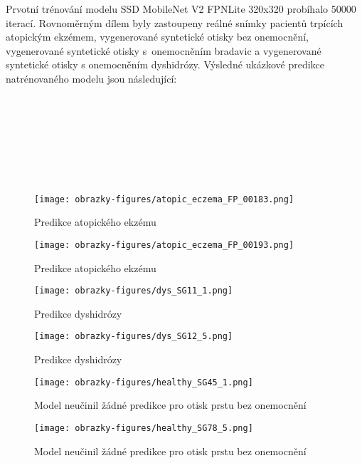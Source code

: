 Prvotní trénování modelu SSD MobileNet V2 FPNLite 320x320 probíhalo 50000 iterací. Rovnoměrným dílem byly zastoupeny reálné snímky pacientů trpících atopickým ekzémem, vygenerované syntetické otisky bez onemocnění, vygenerované syntetické otisky s~onemocněním bradavic a vygenerované syntetické otisky s onemocněním dyshidrózy. Výsledné ukázkové predikce natrénovaného modelu jsou následující:\\\\\\\\\\\\\\\

\begin{figure}[!htbp]
  \begin{minipage}[b]{0.5\linewidth}
    \centering
    \texttt{[image: obrazky-figures/atopic\_eczema\_FP\_00183.png]}
    \caption{Predikce atopického ekzému}
    \label{fig:predikce}
  \end{minipage}
  \hspace{0.5cm}
  \begin{minipage}[b]{0.5\linewidth}
    \centering
    \texttt{[image: obrazky-figures/atopic\_eczema\_FP\_00193.png]}
    \caption{Predikce atopického ekzému}
  \end{minipage}
\end{figure}

\begin{figure}[!htbp]
  \begin{minipage}[b]{0.5\linewidth}
    \centering
    \texttt{[image: obrazky-figures/dys\_SG11\_1.png]}
    \caption{Predikce dyshidrózy}
  \end{minipage}
  \hspace{0.5cm}
  \begin{minipage}[b]{0.5\linewidth}
    \centering
    \texttt{[image: obrazky-figures/dys\_SG12\_5.png]}
    \caption{Predikce dyshidrózy}
  \end{minipage}
\end{figure}

\begin{figure}[!htbp]
  \begin{minipage}[b]{0.5\linewidth}
    \centering
    \texttt{[image: obrazky-figures/healthy\_SG45\_1.png]}
    \caption{Model neučinil žádné predikce pro otisk prstu bez onemocnění}
  \end{minipage}
  \hspace{0.5cm}
  \begin{minipage}[b]{0.5\linewidth}
    \centering
    \texttt{[image: obrazky-figures/healthy\_SG78\_5.png]}
    \caption{Model neučinil žádné predikce pro otisk prstu bez onemocnění}
  \end{minipage}
\end{figure}

